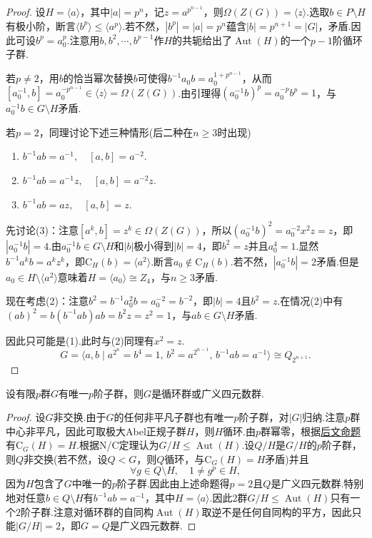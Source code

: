 \begin{proof}
	设$H=\langle a\rangle $，其中$|a|=p^n$，记$z=a^{p^{n-1}}$，则$\Omega(Z(G))=\langle z\rangle $.选取$b\in P\setminus H$有极小阶，断言$\langle b^p\rangle \le\langle a^p\rangle $.若不然，$|b^p|=|a|=p^n$蕴含$|b|=p^{n+1}=|G|$，矛盾.因此可设$b^p=a_0^p$.注意用$b,b^2,\cdots,b^{p-1}$作$H$的共轭给出了$\operatorname*{Aut}(H)$的一个$p-1$阶循环子群.

	若$p\ne 2$，用$b$的恰当幂次替换$b$可使得$b^{-1}a_0b=a_0^{1+p^{n-1}}$，从而$[a_0^{-1},b]=a_0^{-p^{n-1}}\in\langle z\rangle=\Omega(Z(G))$.由引理得$(a_0^{-1}b)^p=a_0^{-p}b^p=1$，与$a_0^{-1}b\in G\setminus H$矛盾.

	若$p=2$，同理讨论下述三种情形(后二种在$n\ge 3$时出现)
	\begin{enumerate}
		\item $b^{-1}ab=a^{-1},\quad[a,b]=a^{-2}$.
		\item $b^{-1}ab=a^{-1}z,\quad[a,b]=a^{-2}z$.
		\item $b^{-1}ab=az,\quad[a,b]=z$.
	\end{enumerate}
	
	先讨论(3)：注意$[a^k,b]=z^k\in\Omega(Z(G))$，所以$(a_0^{-1}b)^2=a_0^{-2}x^2z=z$，即$|a_0^{-1}b|=4$.由$a_0^{-1}b\in G\setminus H$和$|b|$极小得到$|b|=4$，即$b^2=z$并且$a_0^4=1$.显然$b^{-1}a^kb=a^kz^k$，即$\mathrm{C}_H(b)=\langle a^2\rangle$.断言$a_0\notin\mathrm{C}_H(b)$.若不然，$|a_0^{-1}b|=2$矛盾.但是$a_0\in H\setminus\langle a^2\rangle $意味着$H=\langle a_0\rangle\cong Z_4$，与$n\ge 3$矛盾.

	现在考虑(2)：注意$b^2=b^{-1}a_0^2b=a_0^{-2}=b^{-2}$，即$|b|=4$且$b^2=z$.在情况(2)中有$(ab)^2=b(b^{-1}ab)ab=b^2z=z^2=1$，与$ab\in G\setminus H$矛盾.

	因此只可能是(1).此时与(2)同理有$x^2=z$.
	\[
		G=\langle a,b\mid a^{2^n}=b^4=1,\,b^2=a^{2^{n-1}},\,b^{-1}ab=a^{-1}\rangle\cong Q_{2^{n+1}}.
	\]
\end{proof}
\begin{prop}
	设有限$p$群$G$有唯一$p$阶子群，则$G$是循环群或广义四元数群.
\end{prop}
\begin{proof}
	设$G$非交换.由于$G$的任何非平凡子群也有唯一$p$阶子群，对$|G|$归纳.注意$p$群中心非平凡，因此可取极大Abel正规子群$H$，则$H$循环.由$p$群幂零，根据\hyperlink{prop:MaxAbelNormalSubgrpOfNilGrp}{后文命题}有$\mathrm{C}_G(H)=H$.根据N/C定理认为$G/H\le\operatorname*{Aut}(H)$.设$Q/H$是$G/H$的$p$阶子群，则$Q$非交换(若不然，设$Q<G$，则$Q$循环，与$\mathrm{C}_G(H)=H$矛盾)并且
	\[
		\forall g\in Q\setminus H,\quad 1\ne g^p\in H,
	\]
	因为$H$包含了$G$中唯一的$p$阶子群.因此由上述命题得$p=2$且$Q$是广义四元数群.特别地对任意$b\in Q\setminus H$有$b^{-1}ab=a^{-1}$，其中$H=\langle a\rangle $.因此$2$群$G/H\le\operatorname*{Aut}(H)$只有一个$2$阶子群.注意对循环群的自同构$\operatorname*{Aut}(H)$取逆不是任何自同构的平方，因此只能$|G/H|=2$，即$G=Q$是广义四元数群.
\end{proof}
